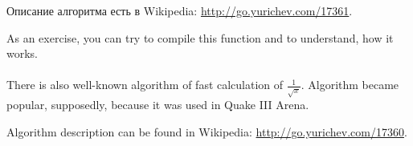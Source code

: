 Описание алгоритма есть в Wikipedia: \url{http://go.yurichev.com/17361}.
\fi %

\ifdefined\ENGLISH
As an exercise, you can try to compile this function and to understand, how it works. \\
\\
There is also well-known algorithm of fast calculation of $\frac{1}{\sqrt{x}}$.
Algorithm became popular, supposedly, because it was used in Quake III Arena.

Algorithm description can be found in Wikipedia: \url{http://go.yurichev.com/17360}.
\fi %

